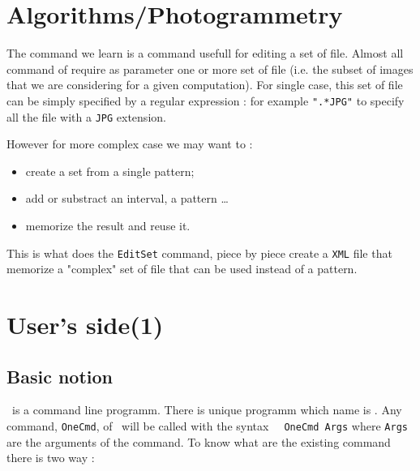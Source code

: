 
\section{Algorithms/Photogrammetry}

The command we learn is a command usefull for editing a set of file.
Almost all command of \PPP require as parameter one or more set of 
file (i.e. the subset of images that we are considering for a given computation).
For single case, this set of file can be simply specified by a regular expression :
for example {\tt ".*JPG"} to specify all the file with a {\tt JPG} extension.

However for more complex case we may want to :

\begin{itemize}
   \item  create a set from a single pattern;
   \item  add or substract an interval, a pattern \dots
   \item  memorize the result and reuse it.
\end{itemize}


This is what does the  {\tt EditSet} command, piece by piece create a
{\tt XML} file that memorize a "complex" set of file that can be used
instead of a pattern.


\section{User's side(1)}


\subsection{Basic notion }

\PPP\, is a command line programm. There is unique programm which
name is \CdPPP. Any command, {\tt OneCmd}, of \PPP\, will be called with the 
syntax {\tt  \CdPPP\,  OneCmd Args} where {\tt Args} are the arguments
of the command. To know what are the existing command there is two way :


